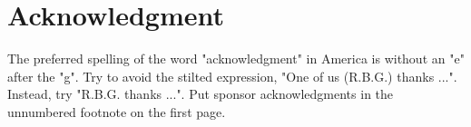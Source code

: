 

\section*{Acknowledgment}

The preferred spelling of the word "acknowledgment" in America is without
an "e" after the "g". Try to avoid the stilted expression, "One of us
(R.B.G.) thanks ...". Instead, try "R.B.G. thanks ...". Put sponsor
acknowledgments in the unnumbered footnote on the first page.



%
%
%

